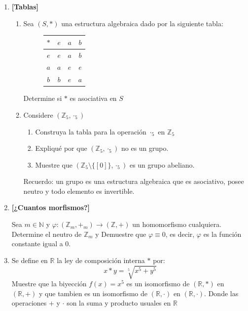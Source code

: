 \documentclass[letterpaper,10pt]{article}
\newcommand{\R}{\mathbb R}
\newcommand{\N}{\mathbb N}
\newcommand{\Z}{\mathbb Z}
\theoremstyle{plain}
\begin{document}
\begin{enumerate}[\bf P1.]
    
    \item \textbf{[Tablas]}
        \begin{enumerate}
            \item Sea $(S,\ast)$ una estructura algebraica dado por la siguiente tabla:
            \begin{figure}[h]
                \centering
                \begin{tabular}{c|ccc}
                    $\ast$ & $e$ & $a$ & $b$ \\ \hline
                    $e$ & $e$ & $a$ & $b$\\
                    $a$ & $a$ & $e$ & $e$\\
                    $b$ & $b$ & $e$ & $a$
                \end{tabular}
            \end{figure}
            Determine si $\ast$ es asociativa en $S$
            \item Considere $(\Z_{5},\cdot_{5})$
                \begin{enumerate}
                    \item Construya la tabla para la operación $\cdot_{5}$ en $\Z_5$
                    \item Expliqué por que $(\Z_5,\cdot_5)$ no es un grupo.
                    \item Muestre que $(\Z_5 \setminus \{[0]\}, \cdot_5)$ es un grupo abeliano.
                \end{enumerate}
            Recuerdo: un grupo es una estructura algebraica que es asociativo, posee neutro y todo elemento es invertible.
        \end{enumerate}
    
    \item \textbf{[¿Cuantos morfismos?]} 
    
    Sea $m\in \N$ y $\varphi :(\Z_m,+_{m}) \to (\Z,+)$ un homomorfismo cualquiera. Determine el neutro de $\Z_m$ y Demuestre que $\varphi \equiv 0$, es decir, $\varphi$ es la función constante igual a 0.
    
        \item Se define en $\R$ la ley de composición interna $*$ por:
            $$ x*y= \sqrt[5]{x^5+y^5}$$
            Muestre que la biyección $f(x)=x^5$ es un isomorfismo de $(\R,*)$ en $(\R,+)$ y que tambien es un isomorfismo de $(\R,\cdot)$ en $(\R, \cdot)$. Donde las operaciones $+$ y $\cdot$ son la suma y producto usuales en $\R$
    
    
\end{enumerate}
\end{document}
